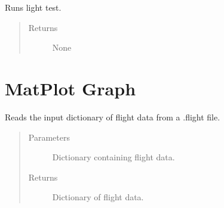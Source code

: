 \documentclass[letterpaper,10pt,english]{sphinxmanual}
\begin{document}
\begin{fulllineitems}
\begin{fulllineitems}
\end{fulllineitems}


\begin{fulllineitems}
\label{\detokenize{index:src.Views.View_VerifySetupScreen.VerifySetupWindow.testLight}}
Runs light test.
\begin{quote}\begin{description}
\item[{Returns}] \leavevmode
None

\end{description}\end{quote}

\end{fulllineitems}


\end{fulllineitems}



\chapter{MatPlot Graph}
\label{\detokenize{index:module-src.Views.Graph}}\label{\detokenize{index:matplot-graph}}

\begin{fulllineitems}
\label{\detokenize{index:src.Views.Graph.checkCoordinates}}
Reads the input dictionary of flight data from a .flight file.
\begin{quote}\begin{description}
\item[{Parameters}] \leavevmode
{} \textendash{} Dictionary containing flight data.

\item[{Returns}] \leavevmode
Dictionary of flight data.

\end{description}\end{quote}

\end{fulllineitems}
\end{document}
